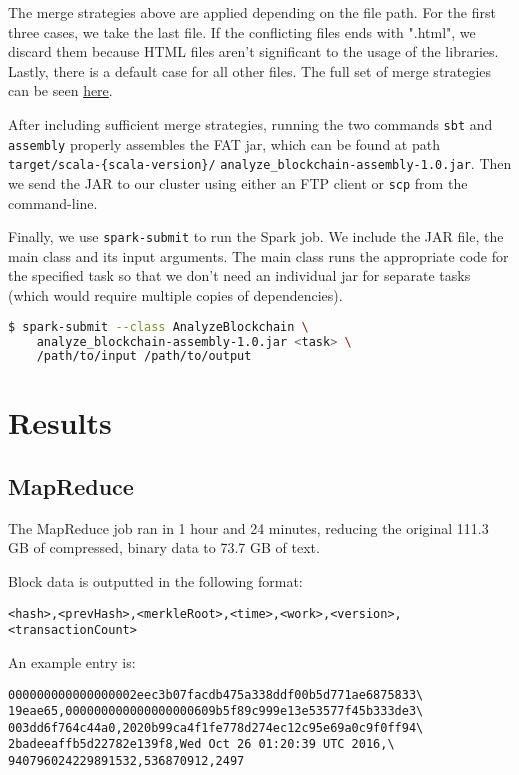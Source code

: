 \documentclass[9pt,twocolumn,twoside]{idsi}
\begin{document}
The merge strategies above are applied depending on the file path. For the first three cases, we take the last file. If the conflicting files ends with ".html", we discard them because HTML files aren't significant to the usage of the libraries. Lastly, there is a default case for all other files. The full set of merge strategies can be seen \href{https://google.com}{here}.

After including sufficient merge strategies, running the two commands \lstinline{sbt} and \lstinline{assembly} properly assembles the FAT jar, which can be found at path \lstinline|target/scala-{scala-version}/| \lstinline|analyze_blockchain-assembly-1.0.jar|. Then we send the JAR to our cluster using either an FTP client or \lstinline{scp} from the command-line.

Finally, we use \lstinline{spark-submit} to run the Spark job. We include the JAR file, the main class and its input arguments. The main class runs the appropriate code for the specified task so that we don't need an individual jar for separate tasks (which would require multiple copies of dependencies).

\begin{lstlisting}[language=bash]
 $ spark-submit --class AnalyzeBlockchain \
    analyze_blockchain-assembly-1.0.jar <task> \
    /path/to/input /path/to/output
\end{lstlisting}

\section{Results}
\subsection{MapReduce}
The MapReduce job ran in 1 hour and 24 minutes, reducing the original 111.3 GB of compressed, binary data to 73.7 GB of text.

Block data is outputted in the following format:
\begin{lstlisting}
<hash>,<prevHash>,<merkleRoot>,<time>,<work>,<version>,
<transactionCount>
\end{lstlisting}

An example entry is:
\begin{lstlisting}
000000000000000002eec3b07facdb475a338ddf00b5d771ae6875833\
19eae65,000000000000000000609b5f89c999e13e53577f45b333de3\
003dd6f764c44a0,2020b99ca4f1fe778d274ec12c95e69a0c9f0ff94\
2badeeaffb5d22782e139f8,Wed Oct 26 01:20:39 UTC 2016,\
940796024229891532,536870912,2497
\end{lstlisting}
\end{document}
